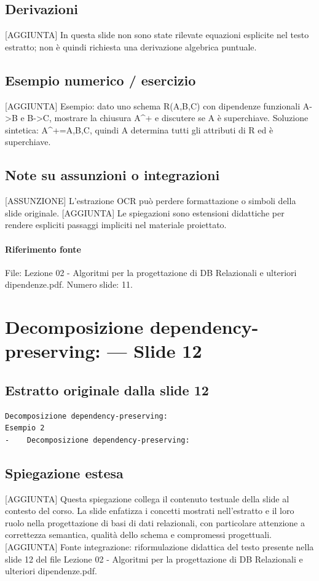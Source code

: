\documentclass[11pt]{article}
\begin{document}
\subsection*{Derivazioni}
[AGGIUNTA] In questa slide non sono state rilevate equazioni esplicite nel testo estratto; non è quindi richiesta una derivazione algebrica puntuale.
\subsection*{Esempio numerico / esercizio}
[AGGIUNTA] Esempio: dato uno schema R(A,B,C) con dipendenze funzionali A->B e B->C, mostrare la chiusura A^+ e discutere se A è superchiave. Soluzione sintetica: A^+={A,B,C}, quindi A determina tutti gli attributi di R ed è superchiave.
\subsection*{Note su assunzioni o integrazioni}
[ASSUNZIONE] L'estrazione OCR può perdere formattazione o simboli della slide originale.
[AGGIUNTA] Le spiegazioni sono estensioni didattiche per rendere espliciti passaggi impliciti nel materiale proiettato.
\paragraph{Riferimento fonte} File: Lezione 02 - Algoritmi per la progettazione di DB Relazionali e ulteriori dipendenze.pdf. Numero slide: 11.
\section{Decomposizione dependency-preserving: --- Slide 12}
\subsection*{Estratto originale dalla slide 12}
\begin{lstlisting}
Decomposizione dependency-preserving:
Esempio 2
-    Decomposizione dependency-preserving:
\end{lstlisting}
\subsection*{Spiegazione estesa}
[AGGIUNTA] Questa spiegazione collega il contenuto testuale della slide al contesto del corso. La slide enfatizza i concetti mostrati nell'estratto e il loro ruolo nella progettazione di basi di dati relazionali, con particolare attenzione a correttezza semantica, qualità dello schema e compromessi progettuali.
[AGGIUNTA] Fonte integrazione: riformulazione didattica del testo presente nella slide 12 del file Lezione 02 - Algoritmi per la progettazione di DB Relazionali e ulteriori dipendenze.pdf.
\end{document}
